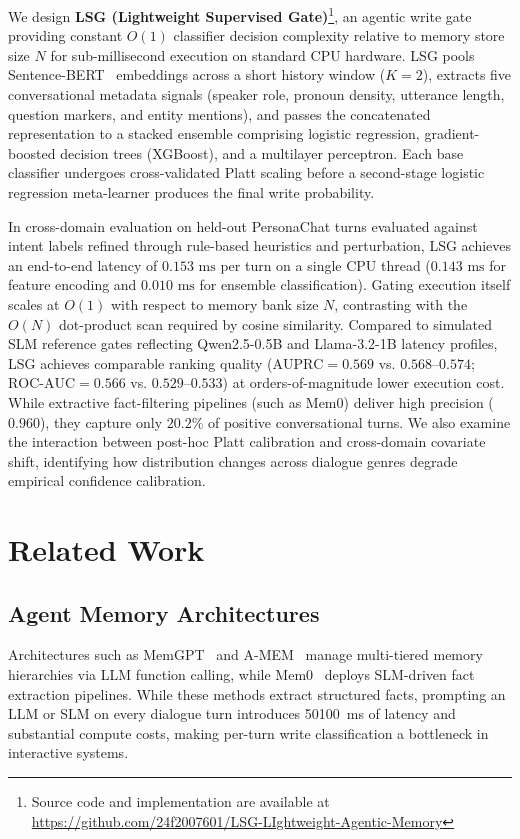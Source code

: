 \documentclass[journal]{IEEEtran}
\begin{document}
We design \textbf{LSG (Lightweight Supervised Gate)}\footnote{Source code and implementation are available at \url{https://github.com/24f2007601/LSG-LIghtweight-Agentic-Memory}}, an agentic write gate providing constant $O(1)$ classifier decision complexity relative to memory store size $N$ for sub-millisecond execution on standard CPU hardware. LSG pools Sentence-BERT~\cite{reimers2019sentence} embeddings across a short history window ($K=2$), extracts five conversational metadata signals (speaker role, pronoun density, utterance length, question markers, and entity mentions), and passes the concatenated representation to a stacked ensemble comprising logistic regression, gradient-boosted decision trees (XGBoost), and a multilayer perceptron. Each base classifier undergoes cross-validated Platt scaling before a second-stage logistic regression meta-learner produces the final write probability.

In cross-domain evaluation on held-out PersonaChat turns evaluated against intent labels refined through rule-based heuristics and perturbation, LSG achieves an end-to-end latency of $0.153\text{ ms}$ per turn on a single CPU thread ($0.143\text{ ms}$ for feature encoding and $0.010\text{ ms}$ for ensemble classification). Gating execution itself scales at $O(1)$ with respect to memory bank size $N$, contrasting with the $O(N)$ dot-product scan required by cosine similarity. Compared to simulated SLM reference gates reflecting Qwen2.5-0.5B and Llama-3.2-1B latency profiles, LSG achieves comparable ranking quality ($\text{AUPRC} = 0.569$ vs. $0.568\text{--}0.574$; $\text{ROC-AUC} = 0.566$ vs. $0.529\text{--}0.533$) at orders-of-magnitude lower execution cost. While extractive fact-filtering pipelines (such as Mem0) deliver high precision ($0.960$), they capture only $20.2\%$ of positive conversational turns. We also examine the interaction between post-hoc Platt calibration and cross-domain covariate shift, identifying how distribution changes across dialogue genres degrade empirical confidence calibration.

\section{Related Work}

\subsection{Agent Memory Architectures}
Architectures such as MemGPT~\cite{packer2023memgpt} and A-MEM~\cite{zhang2024amem} manage multi-tiered memory hierarchies via LLM function calling, while Mem0~\cite{chaudhary2024mem0} deploys SLM-driven fact extraction pipelines. While these methods extract structured facts, prompting an LLM or SLM on every dialogue turn introduces 50\text{--}100~ms of latency and substantial compute costs, making per-turn write classification a bottleneck in interactive systems.
\end{document}
